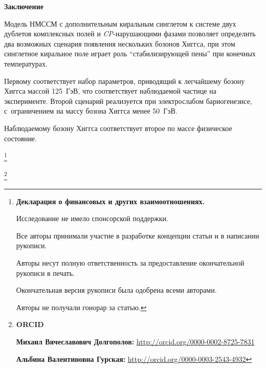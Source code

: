 \smallskip



\textbf{Заключение}

Модель НМССМ с дополнительным киральным синглетом к системе двух дублетов комплексных полей и {\it CP}-нарушающими фазами позволяет определить два возможных сценария появления нескольких бозонов Хиггса, при этом синглетное киральное поле играет роль ``стабилизирующей пены'' при конечных температурах. 

Первому соответствует набор параметров, приводящий к легчайшему бозону Хиггса массой 125~ГэВ, что соответствует наблюдаемой частице на эксперименте. Второй сценарий реализуется при электрослабом бариогенезисе, с~ограничением на массу бозона Хиггса менее 50~ГэВ. 

Наблюдаемому бозону Хиггса соответствует второе по массе физическое состояние.



\smallskip





\thanks{{\bf Декларация о финансовых и других взаимоотношениях.}

Исследование не имело спонсорской поддержки.

Все  авторы  принимали  участие  в  разработке  концепции  \mbox{статьи}  и  в  написании  рукописи. 

Авторы несут  полную  ответственность  за  предоставление  окончательной рукописи в печать.

Окончательная  версия рукописи была одобрена всеми авторами.

Авторы не получали гонорар за статью.

}







\thanks{{\bf ORCID}



{\bf  Михаил Вячеславович Долгополов:} \url{http://orcid.org/0000-0002-8725-7831}



{\bf  Альбина Валентиновна Гурская:} \url{http://orcid.org/0000-0003-2543-4932}



}



\RusRef



